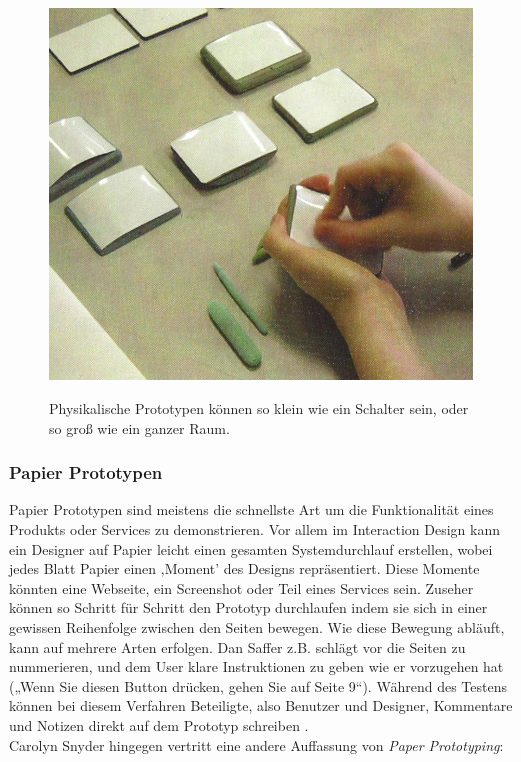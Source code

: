 \begin{figure}
	\begin{center}
        {\includegraphics[width=.8\linewidth]{gfx/safferPhysicalPrototype}}
	\end{center}
		\caption[Physikalische Prototypen. \newline \citep{Saffer:2007}]{Physikalische Prototypen können so klein wie ein Schalter sein, oder so groß wie ein ganzer Raum.}\label{fig:safferPhysicalPrototype}
\end{figure}

\subsubsection{Papier Prototypen} 
Papier Prototypen sind meistens die schnellste Art um die Funktionalität eines Produkts oder Services zu demonstrieren. Vor allem im Interaction Design kann ein Designer auf Papier leicht einen gesamten Systemdurchlauf erstellen, wobei jedes Blatt Papier einen ‚Moment’ des Designs repräsentiert. Diese Momente könnten eine Webseite, ein Screenshot oder Teil eines Services sein. Zuseher können so Schritt für Schritt den Prototyp durchlaufen indem sie sich in einer gewissen Reihenfolge zwischen den Seiten bewegen.
Wie diese Bewegung abläuft, kann auf mehrere Arten erfolgen. Dan Saffer z.B. schlägt vor die Seiten zu nummerieren, und dem User klare Instruktionen zu geben wie er vorzugehen hat („Wenn Sie diesen Button drücken, gehen Sie auf Seite 9“). Während des Testens können bei diesem Verfahren Beteiligte, also Benutzer und Designer, Kommentare und Notizen direkt auf dem Prototyp schreiben \citep{Saffer:2007}.\\
Carolyn Snyder hingegen vertritt eine andere Auffassung von \emph{Paper Prototyping}: 

